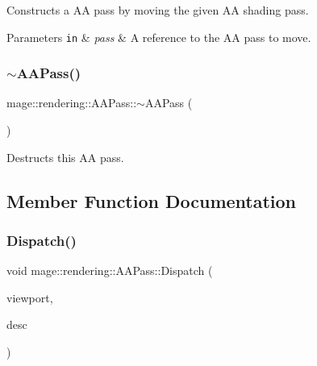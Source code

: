 Constructs a AA pass by moving the given AA shading pass.


\begin{DoxyParams}[1]{Parameters}
\mbox{\tt in}  & {\em pass} & A reference to the AA pass to move. \\
\hline
\end{DoxyParams}
\hypertarget{classmage_1_1rendering_1_1_a_a_pass_a389948121a48218eee21292db38559fd}{}\label{classmage_1_1rendering_1_1_a_a_pass_a389948121a48218eee21292db38559fd} 
\subsubsection{\texorpdfstring{$\sim$\+A\+A\+Pass()}{~AAPass()}}
{\footnotesize\ttfamily mage\+::rendering\+::\+A\+A\+Pass\+::$\sim$\+A\+A\+Pass (\begin{DoxyParamCaption}{ }\end{DoxyParamCaption})\hspace{0.3cm}{\ttfamily [default]}}

Destructs this AA pass. 

\subsection{Member Function Documentation}
\hypertarget{classmage_1_1rendering_1_1_a_a_pass_afea7d676d1c0f16f9a11c1ac2455bbb3}{}\label{classmage_1_1rendering_1_1_a_a_pass_afea7d676d1c0f16f9a11c1ac2455bbb3} 
\subsubsection{\texorpdfstring{Dispatch()}{Dispatch()}}
{\footnotesize\ttfamily void mage\+::rendering\+::\+A\+A\+Pass\+::\+Dispatch (\begin{DoxyParamCaption}\item[{const \hyperlink{classmage_1_1rendering_1_1_viewport}{Viewport} \&}]{viewport,  }\item[{\hyperlink{namespacemage_1_1rendering_a25c189fd1da946d7a8f0abdd4f0e6afa}{A\+A\+Descriptor}}]{desc }\end{DoxyParamCaption})}

